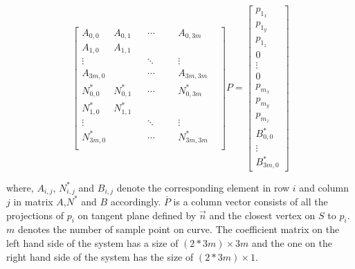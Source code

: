 \begin{equation}
\begin{bmatrix}
A_{0,0}& A_{0,1}& & \cdots& & & A_{0,3m}&\\
A_{1,0}& A_{1,1}& & & & & &\\
\vdots & & & \ddots& & &  \vdots&\\
A_{3m,0}& & & \cdots& & & A_{3m,3m}& \\
N^{*}_{0,0}&  N^{*}_{0,1}&  & \cdots& & & N^{*}_{0,3m}&\\
N^{*}_{1,0}&  N^{*}_{1,1}&  & & & & &\\
\vdots & & & \ddots& & &  \vdots&\\
N^{*}_{3m,0}& & & \cdots& & & N^{*}_{3m,3m}&\\
\end{bmatrix}
P=
\begin{bmatrix}
  p_{1_{x}}\\
  p_{1_{y}}\\
  p_{1_{z}}\\
  0\\
  \vdots\\
  0\\
  p_{m_{x}}\\
  p_{m_{y}}\\
  p_{m_{z}}\\
  B^{*}_{0,0}\\
  \vdots\\
  B^{*}_{3m,0}
\end{bmatrix}
\label{equation:LS_matrix_system_with_constrain}
\end{equation}

where, $A_{i,j}$, $N^{*}_{i,j}$ and $B_{i,j}$ denote the corresponding element in row $i$ and column $j$ in matrix $A$,$N^{*}$ and $B$ accordingly. $\bar{P}$ is a column vector consists of all the projections of $p_{i}$ on tangent plane defined by $\vec{n}$ and the closest vertex on $S$ to $p_{i}$.  $m$ denotes the number of sample point on curve. The coefficient matrix on the left hand side of the system has a size of $(2*3m) \times 3m$ and the one on the right hand side of the system has the size of $(2*3m) \times 1$.

